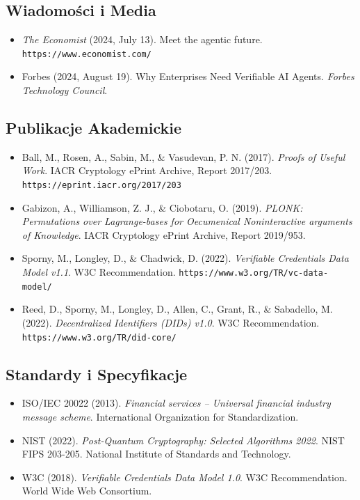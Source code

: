 \documentclass[11pt]{article}
\begin{document}
\subsection*{Wiadomości i Media}

\begin{itemize}[leftmargin=*, label={}]
  \item \textit{The Economist} (2024, July 13). Meet the agentic future. \texttt{https://www.economist.com/}

  \item Forbes (2024, August 19). Why Enterprises Need Verifiable AI Agents. \textit{Forbes Technology Council}.
\end{itemize}

\subsection*{Publikacje Akademickie}

\begin{itemize}[leftmargin=*, label={}]
  \item Ball, M., Rosen, A., Sabin, M., \& Vasudevan, P. N. (2017). \textit{Proofs of Useful Work}. IACR Cryptology ePrint Archive, Report 2017/203. \texttt{https://eprint.iacr.org/2017/203}

  \item Gabizon, A., Williamson, Z. J., \& Ciobotaru, O. (2019). \textit{PLONK: Permutations over Lagrange-bases for Oecumenical Noninteractive arguments of Knowledge}. IACR Cryptology ePrint Archive, Report 2019/953.

  \item Sporny, M., Longley, D., \& Chadwick, D. (2022). \textit{Verifiable Credentials Data Model v1.1}. W3C Recommendation. \texttt{https://www.w3.org/TR/vc-data-model/}

  \item Reed, D., Sporny, M., Longley, D., Allen, C., Grant, R., \& Sabadello, M. (2022). \textit{Decentralized Identifiers (DIDs) v1.0}. W3C Recommendation. \texttt{https://www.w3.org/TR/did-core/}
\end{itemize}

\subsection*{Standardy i Specyfikacje}

\begin{itemize}[leftmargin=*, label={}]
  \item ISO/IEC 20022 (2013). \textit{Financial services -- Universal financial industry message scheme}. International Organization for Standardization.

  \item NIST (2022). \textit{Post-Quantum Cryptography: Selected Algorithms 2022}. NIST FIPS 203-205. National Institute of Standards and Technology.

  \item W3C (2018). \textit{Verifiable Credentials Data Model 1.0}. W3C Recommendation. World Wide Web Consortium.
\end{itemize}
\end{document}
